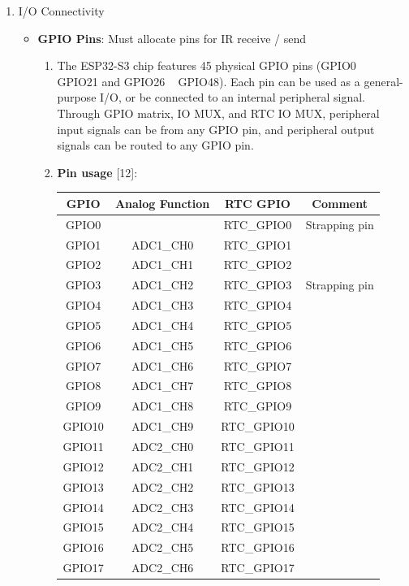 \documentclass[conference]{IEEEtran}
\begin{document}
\begin{enumerate}[label=\arabic*.]
\begin{enumerate}[label=\alph*.]
\item I/O Connectivity\\
\begin{itemize}
\item \textbf{GPIO Pins}: Must allocate pins for IR receive / send\\
\begin{enumerate}[label=\roman*.]
\item The ESP32-S3 chip features 45 physical GPIO pins (GPIO0 ~ GPIO21 and GPIO26 ~ GPIO48). Each pin can be used as a general-purpose I/O, or be connected to an internal peripheral signal. Through GPIO matrix, IO MUX, and RTC IO MUX, peripheral input signals can be from any GPIO pin, and peripheral output signals can be routed to any GPIO pin. \\
\item \textbf{Pin usage} [12]:\\
\begin{table}[ht]
\setlength{\extrarowheight}{2.5pt}
\centering
\begin{tabular}{|c|c|c|c|}
\hline
\textbf{GPIO} & \textbf{Analog Function} & \textbf{RTC GPIO} & \textbf{Comment} \\
\hline
GPIO0 &  & RTC\_GPIO0 & Strapping pin \\
GPIO1 & ADC1\_CH0 & RTC\_GPIO1 &  \\
GPIO2 & ADC1\_CH1 & RTC\_GPIO2 &  \\
GPIO3 & ADC1\_CH2 & RTC\_GPIO3 & Strapping pin \\
GPIO4 & ADC1\_CH3 & RTC\_GPIO4 &  \\
GPIO5 & ADC1\_CH4 & RTC\_GPIO5 &  \\
GPIO6 & ADC1\_CH5 & RTC\_GPIO6 &  \\
GPIO7 & ADC1\_CH6 & RTC\_GPIO7 &  \\
GPIO8 & ADC1\_CH7 & RTC\_GPIO8 &  \\
GPIO9 & ADC1\_CH8 & RTC\_GPIO9 &  \\
GPIO10 & ADC1\_CH9 & RTC\_GPIO10 &  \\
GPIO11 & ADC2\_CH0 & RTC\_GPIO11 &  \\
GPIO12 & ADC2\_CH1 & RTC\_GPIO12 &  \\
GPIO13 & ADC2\_CH2 & RTC\_GPIO13 &  \\
GPIO14 & ADC2\_CH3 & RTC\_GPIO14 &  \\
GPIO15 & ADC2\_CH4 & RTC\_GPIO15 &  \\
GPIO16 & ADC2\_CH5 & RTC\_GPIO16 &  \\
GPIO17 & ADC2\_CH6 & RTC\_GPIO17 &  \\

\end{tabular}
\end{table}
\end{enumerate}
\end{itemize}
\end{enumerate}
\end{enumerate}
\end{document}
